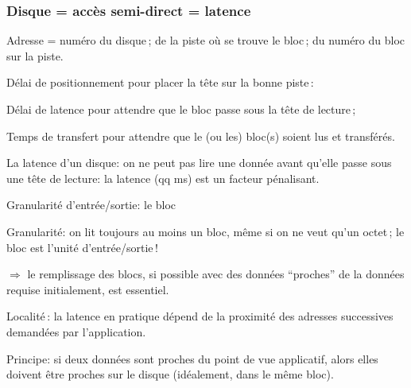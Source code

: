 \begin{frame}
\frametitle{Disque = accès \alert{semi-direct} = latence}

Adresse = numéro du disque\,;
 de la piste où se trouve le bloc\,;
 du numéro du bloc sur la piste.

\vfill

\begin{redbullet}
  \item \alert{Délai de positionnement} pour placer
              la tête sur la bonne piste\,:

  \item \alert{Délai de latence} pour attendre que le bloc
           passe sous la tête de lecture\,;

  \item \alert{Temps de transfert} pour attendre que le (ou les)
                bloc(s) soient lus et transférés.
\end{redbullet}

\vfill

\begin{blocgauche}
\alert{La latence d'un disque}:
on ne peut pas lire une donnée avant qu'elle passe
sous une tête de lecture: la \alert{latence} (qq ms) 
est un facteur pénalisant.
\end{blocgauche}


\end{frame}

\begin{frame}{Granularité d'entrée/sortie: le bloc}

\alert{Granularité}: on lit toujours au moins un bloc,
    même si on ne veut qu'un octet\,; le \alert{bloc} est \alert{l'unité d'entrée/sortie}\,! 

\medskip

  $\Rightarrow$ le remplissage des blocs, si possible  avec des données
     ``proches'' de la données requise initialement, est essentiel.
     
\vfill

\alert{Localité}\,: la latence en pratique dépend de la proximité
   des adresses successives demandées par l'application. 

\begin{blocgauche}
\alert{Principe}: si deux données sont \alert{proches} du point de vue applicatif,
  alors elles doivent être proches sur le disque (idéalement, dans
   le même bloc).
\end{blocgauche}

\end{frame}


